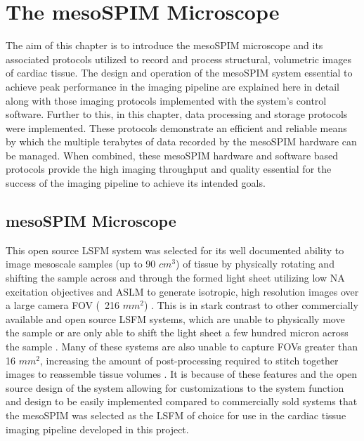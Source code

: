 \chapter{The mesoSPIM Microscope}

The aim of this chapter is to introduce the mesoSPIM microscope and its associated protocols utilized to record and process structural, volumetric images of cardiac tissue. The design and operation of the mesoSPIM system essential to achieve peak performance in the imaging pipeline are explained here in detail along with those imaging protocols implemented with the system's control software. Further to this, in this chapter, data processing and storage protocols were implemented. These protocols demonstrate an efficient and reliable means by which the multiple terabytes of data recorded by the mesoSPIM hardware can be managed. When combined, these mesoSPIM hardware and software based protocols provide the high imaging throughput and quality essential for the success of the imaging pipeline to achieve its intended goals.

\section{mesoSPIM Microscope}

This open source LSFM system was selected for its well documented ability to image mesoscale samples (up to 90 $cm^3$) of tissue by physically rotating and shifting the sample across and through the formed light sheet utilizing low NA excitation objectives and ASLM to generate isotropic, high resolution images over a large camera FOV (~216 $mm^2$) \cite{voigt_mesospim_2019}. This is in stark contrast to other commercially available and open source LSFM systems, which are unable to physically move the sample or are only able to shift the light sheet a few hundred micron across the sample \cite{poola_light_2019}. Many of these systems are also unable to capture FOVs greater than 16 $mm^2$, increasing the amount of post-processing required to stitch together images to reassemble tissue volumes \cite{poola_light_2019}. It is because of these features and the open source design of the system allowing for customizations to the system function and design to be easily implemented compared to commercially sold systems that the mesoSPIM was selected as the LSFM of choice for use in the cardiac tissue imaging pipeline developed in this project. 

